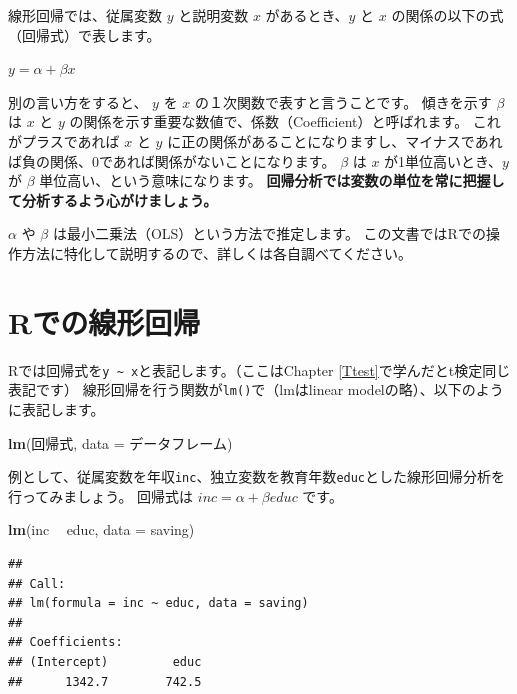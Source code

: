 \documentclass[]{book}
\newenvironment{Shaded}{\begin{snugshade}}{\end{snugshade}}
\newcommand{\KeywordTok}[1]{\textcolor[rgb]{0.13,0.29,0.53}{\textbf{#1}}}
\newcommand{\DataTypeTok}[1]{\textcolor[rgb]{0.13,0.29,0.53}{#1}}
\newcommand{\StringTok}[1]{\textcolor[rgb]{0.31,0.60,0.02}{#1}}
\newcommand{\OperatorTok}[1]{\textcolor[rgb]{0.81,0.36,0.00}{\textbf{#1}}}
\newcommand{\NormalTok}[1]{#1}
\begin{document}
線形回帰では、従属変数 \(y\) と説明変数 \(x\) があるとき、\(y\) と \(x\)
の関係の以下の式（回帰式）で表します。

\(y = \alpha + \beta x\)

別の言い方をすると、 \(y\) を \(x\) の１次関数で表すと言うことです。
傾きを示す \(\beta\) は \(x\) と \(y\)
の関係を示す重要な数値で、係数（Coefficient）と呼ばれます。
これがプラスであれば \(x\) と \(y\)
に正の関係があることになりますし、マイナスであれば負の関係、0であれば関係がないことになります。
\(\beta\) は \(x\) が1単位高いとき、\(y\) が \(\beta\)
単位高い、という意味になります。
\textbf{回帰分析では変数の単位を常に把握して分析するよう心がけましょう。}

\(\alpha\) や \(\beta\) は最小二乗法（OLS）という方法で推定します。
この文書ではRでの操作方法に特化して説明するので、詳しくは各自調べてください。

\section{Rでの線形回帰}\label{rux3067ux306eux7ddaux5f62ux56deux5e30}

Rでは回帰式を\texttt{y\ \textasciitilde{}\ x}と表記します。（ここはChapter
\ref{Ttest}で学んだとt検定同じ表記です）
線形回帰を行う関数が\texttt{lm()}で（lmはlinear
modelの略）、以下のように表記します。

\begin{Shaded}
\begin{Highlighting}[]
\KeywordTok{lm}\NormalTok{(回帰式, }\DataTypeTok{data =}\NormalTok{ データフレーム)}
\end{Highlighting}
\end{Shaded}

例として、従属変数を年収\texttt{inc}、独立変数を教育年数\texttt{educ}とした線形回帰分析を行ってみましょう。
回帰式は \(inc = \alpha + \beta educ\) です。

\begin{Shaded}
\begin{Highlighting}[]
\KeywordTok{lm}\NormalTok{(inc }\OperatorTok{~}\StringTok{ }\NormalTok{educ, }\DataTypeTok{data =}\NormalTok{ saving)}
\end{Highlighting}
\end{Shaded}

\begin{verbatim}
## 
## Call:
## lm(formula = inc ~ educ, data = saving)
## 
## Coefficients:
## (Intercept)         educ  
##      1342.7        742.5
\end{verbatim}
\end{document}
